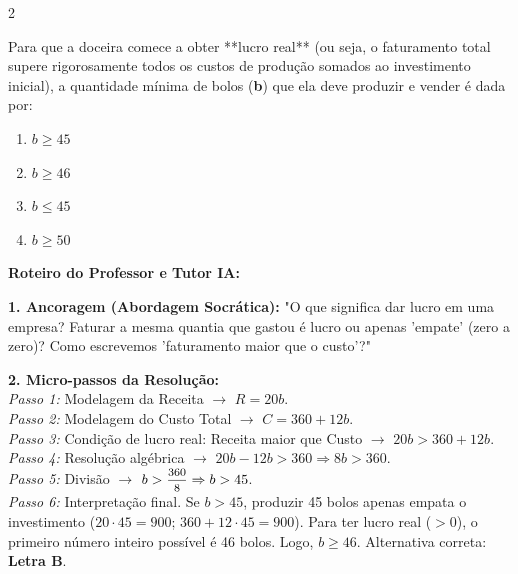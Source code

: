 \begin{multicols*}{2}
\begin{enunciadoLiteral}
Para que a doceira comece a obter **lucro real** (ou seja, o faturamento total supere rigorosamente todos os custos de produção somados ao investimento inicial), a quantidade mínima de bolos (\textbf{b}) que ela deve produzir e vender é dada por:

\begin{enumerate}[label=\alph*), itemsep=\espacoAlt]
\item $ b \ge 45 $
\item $ b \ge 46 $
\item $ b \le 45 $
\item $ b \ge 50 $
\end{enumerate}
\end{enunciadoLiteral}

\ifgabarito
    \begin{tcolorbox}[colback=CorTitUm!5, colframe=CorTitUm, boxrule=1pt, arc=4pt, left=6pt, right=6pt, top=6pt, bottom=6pt]
    \small\textbf{\textcolor{CorTitUm}{Roteiro do Professor e Tutor IA:}}\par\vspace{0.1cm}
    \color{CinzaEscuro}
    \textbf{1. Ancoragem (Abordagem Socrática):} "O que significa dar lucro em uma empresa? Faturar a mesma quantia que gastou é lucro ou apenas 'empate' (zero a zero)? Como escrevemos 'faturamento maior que o custo'?"\par\vspace{0.1cm}
    
    \textbf{2. Micro-passos da Resolução:}\\
    \textit{Passo 1:} Modelagem da Receita $\rightarrow$ $R = 20b$.\\
    \textit{Passo 2:} Modelagem do Custo Total $\rightarrow$ $C = 360 + 12b$.\\
    \textit{Passo 3:} Condição de lucro real: Receita maior que Custo $\rightarrow$ $20b > 360 + 12b$.\\
    \textit{Passo 4:} Resolução algébrica $\rightarrow$ $20b - 12b > 360 \Rightarrow 8b > 360$.\\
    \textit{Passo 5:} Divisão $\rightarrow$ $b > \mfrac{360}{8} \Rightarrow b > 45$.\\
    \textit{Passo 6:} Interpretação final. Se $b > 45$, produzir 45 bolos apenas empata o investimento ($20 \cdot 45 = 900$; $360 + 12 \cdot 45 = 900$). Para ter lucro real ($>0$), o primeiro número inteiro possível é 46 bolos. Logo, $b \ge 46$. Alternativa correta: \textbf{Letra B}.\par\vspace{0.1cm}
    

\end{tcolorbox}
\end{multicols*}
